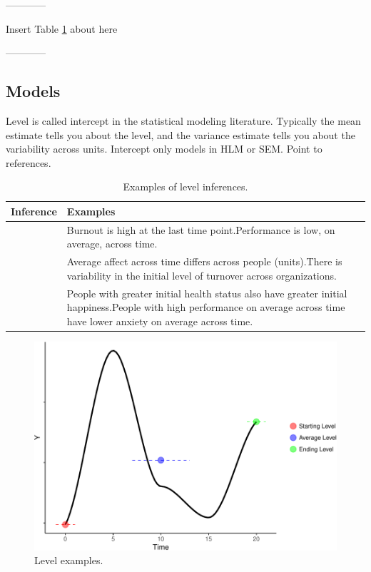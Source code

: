 \documentclass[english,,man]{apa6}
\theoremstyle{definition}
\theoremstyle{definition}
\theoremstyle{definition}
\theoremstyle{remark}
\begin{document}
\begin{center}

------------

Insert Table \ref{level_table} about here

------------

\end{center}

\hypertarget{models}{%
\subsection{Models}\label{models}}

Level is called intercept in the statistical modeling literature.
Typically the mean estimate tells you about the level, and the variance
estimate tells you about the variability across units. Intercept only
models in HLM or SEM. Point to references.

\begin{table}

\caption{\label{tab:unnamed-chunk-7}\label{level_table}Examples of level inferences.}
\centering
\begin{tabular}[t]{>{\raggedright\arraybackslash}p{5em}>{\raggedright\arraybackslash}p{30em}}
\toprule
Inference & Examples\\
\midrule
1 & Burnout is high at the last time point.\newline Performance is low, on average, across time.\\
\hline
2 & Average affect across time differs across people (units).\newline There is variability in the initial level of turnover across organizations.\\
\hline
3 & People with greater initial health status also have greater initial happiness.\newline People with high performance on average across time have lower anxiety on average across time.\\
\bottomrule
\end{tabular}
\end{table}

\begin{figure}
\centering
\includegraphics{figures/unnamed-chunk-8-1.pdf}
\caption{\label{fig:unnamed-chunk-8}Level examples.\label{level}}
\end{figure}
\end{document}
